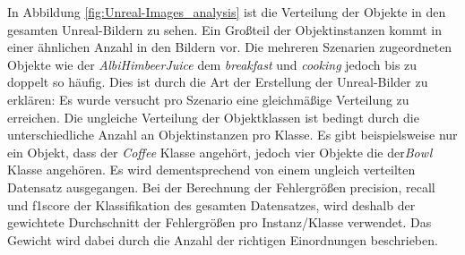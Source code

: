 In Abbildung \ref{fig:Unreal-Images_analysis} ist die Verteilung der Objekte in den gesamten Unreal-Bildern zu sehen. Ein Großteil der Objektinstanzen kommt in einer ähnlichen Anzahl in den Bildern vor. Die mehreren Szenarien zugeordneten Objekte wie der \textit{AlbiHimbeerJuice} dem \textit{breakfast} und \textit{cooking} jedoch bis zu doppelt so häufig. Dies ist durch die Art der Erstellung der Unreal-Bilder zu erklären: Es wurde versucht pro Szenario eine gleichmäßige Verteilung zu erreichen. \newline
Die ungleiche Verteilung der Objektklassen ist bedingt durch die unterschiedliche Anzahl an Objektinstanzen pro Klasse. Es gibt beispielsweise nur ein Objekt, dass der \textit{Coffee} Klasse angehört, jedoch vier Objekte die der\textit{Bowl} Klasse angehören. \newline
Es wird dementsprechend von einem ungleich verteilten Datensatz ausgegangen. Bei der Berechnung der Fehlergrößen \gls{precision}, \gls{recall} und \gls{f1score} der Klassifikation des gesamten Datensatzes, wird deshalb der gewichtete Durchschnitt der Fehlergrößen pro Instanz/Klasse verwendet. Das Gewicht wird dabei durch die Anzahl der richtigen Einordnungen beschrieben. \par


